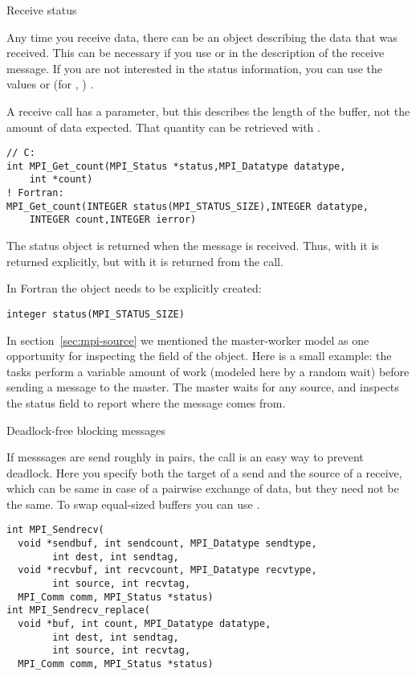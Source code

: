  {Receive status}

Any time you receive data, there can be an 
object describing the data that was received. This can be necessary if
you use  or  in
the description of the receive message. If you are not interested in
the status information, you can use the values
 or (for ,
) .

A receive call has a  parameter, but this describes the length
of the buffer, not the amount of data expected. That quantity
can be retrieved with .
\begin{verbatim}
// C:
int MPI_Get_count(MPI_Status *status,MPI_Datatype datatype,
    int *count)
! Fortran:
MPI_Get_count(INTEGER status(MPI_STATUS_SIZE),INTEGER datatype,
    INTEGER count,INTEGER ierror)
\end{verbatim}

The status object is returned when the message is received. Thus, with
 it is returned explicitly,
but with  it is returned from the  call.
\begin{fortrannote}
  In Fortran the  object needs to be explicitly created:
\begin{verbatim}
integer status(MPI_STATUS_SIZE)
\end{verbatim}
\end{fortrannote}

In section~\ref{sec:mpi-source} we mentioned the master-worker model
as one opportunity for inspecting the  field
of the  object. Here is a small example: 
the tasks perform a variable amount of work (modeled here by a random wait)
before sending a message to the master. The master waits for any source,
and inspects the status field to report where the message comes from.


 {Deadlock-free blocking messages}

If messsages are send roughly in pairs, the 
 call is an easy way to prevent deadlock.
Here you specify both the target of a send and the source of a receive,
which can be same in case of a pairwise exchange of data,
but they need not be the same. To swap equal-sized buffers you
can use .
\begin{verbatim}
int MPI_Sendrecv(
  void *sendbuf, int sendcount, MPI_Datatype sendtype, 
        int dest, int sendtag,
  void *recvbuf, int recvcount, MPI_Datatype recvtype, 
        int source, int recvtag,
  MPI_Comm comm, MPI_Status *status)
int MPI_Sendrecv_replace(
  void *buf, int count, MPI_Datatype datatype, 
        int dest, int sendtag,
        int source, int recvtag,
  MPI_Comm comm, MPI_Status *status)
\end{verbatim}

